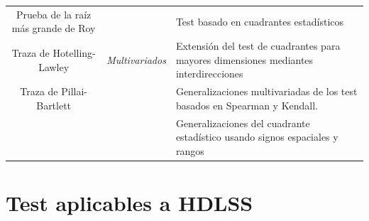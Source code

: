 \documentclass[]{book}
\begin{document}
\begin{longtable}[]{@{}ccl@{}}
\begin{minipage}[t]{0.25\columnwidth}
Prueba de la raíz más grande de Roy\strut
\end{minipage} & \begin{minipage}[t]{0.10\columnwidth}\centering\strut
\strut
\end{minipage} & \begin{minipage}[t]{0.56\columnwidth}\raggedright\strut
Test basado en cuadrantes estadísticos\strut
\end{minipage}\tabularnewline
\begin{minipage}[t]{0.25\columnwidth}\centering\strut
Traza de Hotelling-Lawley\strut
\end{minipage} & \begin{minipage}[t]{0.10\columnwidth}\centering\strut
\emph{\emph{Multivariados}}\strut
\end{minipage} & \begin{minipage}[t]{0.56\columnwidth}\raggedright\strut
Extensión del test de cuadrantes para mayores dimensiones mediantes
interdirecciones\strut
\end{minipage}\tabularnewline
\begin{minipage}[t]{0.25\columnwidth}\centering\strut
Traza de Pillai-Bartlett\strut
\end{minipage} & \begin{minipage}[t]{0.10\columnwidth}\centering\strut
\strut
\end{minipage} & \begin{minipage}[t]{0.56\columnwidth}\raggedright\strut
Generalizaciones multivariadas de los test basados en Spearman y
Kendall.\strut
\end{minipage}\tabularnewline
\begin{minipage}[t]{0.25\columnwidth}\centering\strut
\strut
\end{minipage} & \begin{minipage}[t]{0.10\columnwidth}\centering\strut
\strut
\end{minipage} & \begin{minipage}[t]{0.56\columnwidth}\raggedright\strut
Generalizaciones del cuadrante estadístico usando signos espaciales y
rangos\strut
\end{minipage}\tabularnewline
\bottomrule
\end{longtable}

\section{Test aplicables a HDLSS}\label{test-aplicables-a-hdlss}
\end{document}
